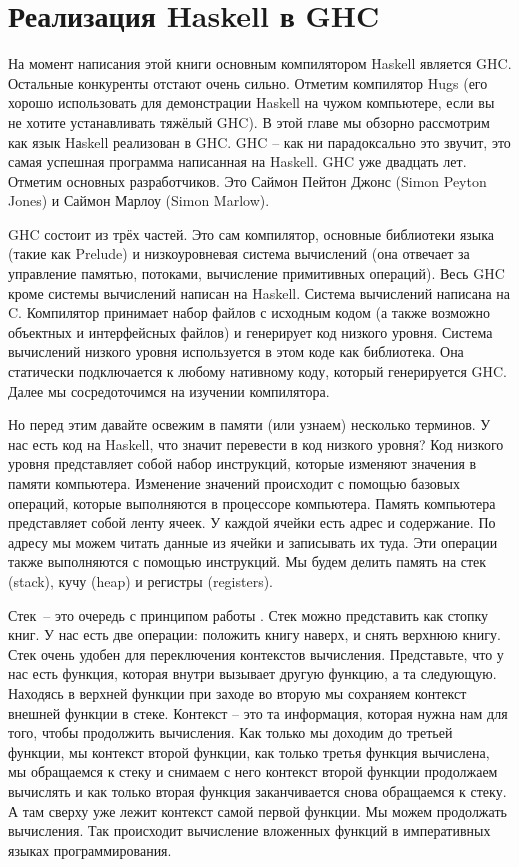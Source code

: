 \setcounter{chapter}{9}
\chapter{Реализация Haskell в GHC}

На момент написания этой книги основным компилятором
Haskell является GHC. Остальные конкуренты отстают очень
сильно. Отметим компилятор Hugs (его хорошо использовать 
для демонстрации Haskell на чужом компьютере, если вы не хотите
устанавливать тяжёлый GHC).
В этой главе мы обзорно рассмотрим как язык Hаskell 
реализован в GHC. 
GHC -- как ни парадоксально это звучит, это самая успешная
программа написанная на Haskell. GHC уже двадцать лет.
Отметим основных разработчиков. Это Саймон Пейтон Джонс
(Simon Peyton Jones) и Саймон Марлоу (Simon Marlow).

GHC состоит из трёх частей. Это сам компилятор, основные
библиотеки языка (такие как Prelude) и низкоуровневая 
система вычислений (она отвечает за управление памятью, 
потоками, вычисление примитивных операций). 
Весь GHC кроме системы вычислений
написан на Haskell. Система вычислений написана на C.
Компилятор принимает набор файлов с исходным кодом 
(а также возможно объектных и интерфейсных файлов) 
и генерирует код низкого уровня. Система вычислений низкого уровня
используется в этом коде как библиотека. Она статически 
подключается к любому нативному коду, который генерируется GHC. 
Далее мы сосредоточимся на изучении компилятора. 

Но перед этим давайте освежим в памяти (или узнаем)
несколько терминов. У нас есть код на Haskell, что значит
перевести в код низкого уровня? Код низкого уровня представляет
собой набор инструкций, которые изменяют значения в памяти
компьютера. Изменение значений происходит с помощью 
базовых операций, которые выполняются в процессоре компьютера.
Память компьютера представляет собой ленту ячеек. У каждой
ячейки есть адрес и содержание. По адресу мы можем читать
данные из ячейки и записывать их туда. Эти операции также
выполняются с помощью инструкций. 
Мы будем делить память на стек (stack), кучу (heap) и 
регистры (registers). 

Стек~-- это очередь с 
принципом работы .
Стек можно представить как стопку книг. У нас есть две
операции: положить книгу наверх, и снять верхнюю книгу.
Стек очень удобен для переключения контекстов вычисления.
Представьте, что у нас есть функция, которая внутри 
вызывает другую функцию, а та следующую. Находясь в 
верхней функции при заходе во вторую мы сохраняем контекст
внешней функции в стеке. Контекст -- это та информация, которая
нужна нам для того, чтобы продолжить вычисления. 
Как только мы доходим до третьей функции, мы  контекст второй функции, как только третья функция вычислена,
мы обращаемся к стеку и снимаем с него контекст второй функции
продолжаем вычислять и как только вторая функция заканчивается
снова обращаемся к стеку. А там сверху уже лежит контекст 
самой первой функции. Мы можем продолжать вычисления. Так 
происходит вычисление вложенных функций в императивных 
языках программирования. 

